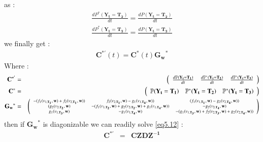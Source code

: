 as :
\begin{eqnarray}
\frac{dP^*(\mathbf{Y_t}=\mathbf{T_2})}{dt}=\frac{dP(\mathbf{Y_t}=\mathbf{T_2})}{dt} \\
\frac{dP^*(\mathbf{Y_t}=\mathbf{T_3})}{dt}=\frac{dP(\mathbf{Y_t}=\mathbf{T_3})}{dt}
\end{eqnarray}
we finally get :
\begin{eqnarray}
\label{eq5.12} \mathbf{C}^{*'}(t)=\mathbf{C}^*(t)\mathbf{G_w}^*
\end{eqnarray}
Where :
\begin{eqnarray}
\nonumber
\mathbf{C}^{*'}&=&\left(\begin{array}{ccc} \frac{d\mathbb{P}(\mathbf{Y_t}=\mathbf{T_1})}{dt} & \frac{d\mathbb{P}^*(\mathbf{Y_t}=\mathbf{T_2})}{dt} & \frac{d\mathbb{P}^*(\mathbf{Y_t}=\mathbf{T_3})}{dt} \end{array}\right) \\
%
\nonumber \mathbf{C}^{*}&=&\left(\begin{array}{ccc} \mathbb{P}(\mathbf{Y_t}=\mathbf{T_1}) & \mathbb{P}^*(\mathbf{Y_t}=\mathbf{T_2}) & \mathbb{P}^*(\mathbf{Y_t}=\mathbf{T_3}) \end{array}\right) \\
%
\nonumber \mathbf{G_w}^*&=& \scriptsize{
\left(\begin{array}{cccc}
-(f_1(v_{1,\mathbf{T_1}}, \mathbf{w})+f_2(v_{2,\mathbf{T_1}}, \mathbf{w})) & f_2(v_{2,\mathbf{T_1}}, \mathbf{w})-g_1(v_{1,\mathbf{T_4}}, \mathbf{w})) & (f_1(v_{1,\mathbf{T_1}}, \mathbf{w})-g_2(v_{2,\mathbf{T_4}}, \mathbf{w})) \\
(g_2(v_{2,\mathbf{T_2}}, \mathbf{w})  & -(f_1(v_{1,\mathbf{T_2}}, \mathbf{w})+g_2(v_{2,\mathbf{T_2}}, \mathbf{w})+g_1(v_{1,\mathbf{T_4}}, \mathbf{w})) & -g_2(v_{2,\mathbf{T_4}}, \mathbf{w})  \\
g_1(v_{1,\mathbf{T_3}}, \mathbf{w}) & -g_1(v_{1,\mathbf{T_4}}, \mathbf{w})  & -(g_1(v_{1,\mathbf{T_3}}, \mathbf{w})+f_2(v_{2,\mathbf{T_3}}, \mathbf{w})+g_2(v_{2,\mathbf{T_4}}, \mathbf{w}))
\end{array}\right)}
\end{eqnarray}
then if $\mathbf{G_w}^*$ is diagonizable we can readily solve \eqref{eq5.12} :
\begin{eqnarray}
\mathbf{C}^{*'}&=&\mathbf{CZDZ^{-1}}
\end{eqnarray}
